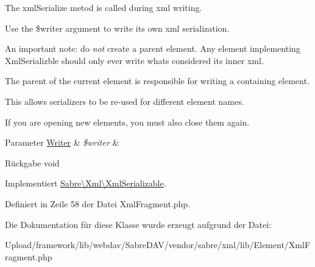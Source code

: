 The xml\+Serialize metod is called during xml writing.

Use the \$writer argument to write its own xml serialization.

An important note\+: do {\itshape not} create a parent element. Any element implementing Xml\+Serializble should only ever write what\textquotesingle{}s considered its \textquotesingle{}inner xml\textquotesingle{}.

The parent of the current element is responsible for writing a containing element.

This allows serializers to be re-\/used for different element names.

If you are opening new elements, you must also close them again.


\begin{DoxyParams}[1]{Parameter}
\mbox{\hyperlink{class_sabre_1_1_xml_1_1_writer}{Writer}} & {\em \$writer} & \\
\hline
\end{DoxyParams}
\begin{DoxyReturn}{Rückgabe}
void 
\end{DoxyReturn}


Implementiert \mbox{\hyperlink{interface_sabre_1_1_xml_1_1_xml_serializable_aa78f3ee43aa699be8347181653a53d8c}{Sabre\textbackslash{}\+Xml\textbackslash{}\+Xml\+Serializable}}.



Definiert in Zeile 58 der Datei Xml\+Fragment.\+php.



Die Dokumentation für diese Klasse wurde erzeugt aufgrund der Datei\+:\begin{DoxyCompactItemize}
\item 
Upload/framework/lib/webdav/\+Sabre\+D\+A\+V/vendor/sabre/xml/lib/\+Element/Xml\+Fragment.\+php\end{DoxyCompactItemize}
